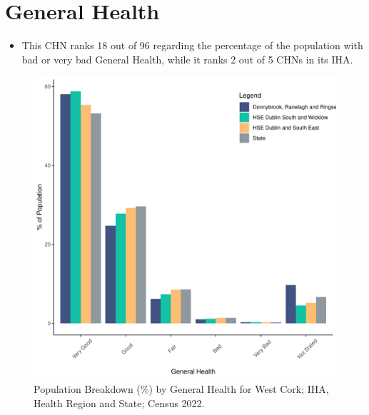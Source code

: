 \documentclass{article}
\begin{document}
\pagebreak

\section{General Health}\label{sect:GenHealth}
\begin{itemize}
\item  This CHN ranks  18 out of 96 regarding the percentage of the population with bad or very bad General Health, while it ranks   2 out of 5 CHNs in its IHA.
\end{itemize}
\begin{figure}[h]
	\centering
	\includegraphics[width = 150mm]{../figures/GenED.pdf}
	\caption{Population Breakdown (\%) by General Health for West Cork; IHA, Health Region and State;  Census 2022.}
	\label{fig:2ae19629-1a6a-13a3-e055-000000000001}
	\end{figure}
\end{document}

